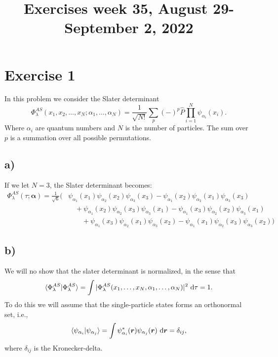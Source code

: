 \documentclass[a4paper, 11pt, notitlepage, english]{article}
\title{Exercises week 35, August 29-September 2, 2022}
\newcommand{\braket}[2]{\langle #1 | #2 \rangle}
\newcommand{\op}[1]{\hat{#1}}
\renewcommand{\d}{{\rm d}}
\newcommand{\bt}[1]{\boldsymbol{#1}}
\begin{document}
\maketitle

\section*{Exercise 1}

In this problem we consider the Slater determinant
$$\Phi_\lambda^{AS} (x_1, x_2, \ldots, x_N; \alpha_1, \ldots, \alpha_N) = \frac{1}{\sqrt{N!}}\sum_p (-)^p \op{P} \prod_{i=1}^N \psi_{\alpha_i}(x_i).$$
Where $\alpha_i$ are quantum numbers and $N$ is the number of particles. The sum over $p$ is a summation over all possible permutations.

\subsection*{a)}
If we let $N=3$, the Slater determinant becomes:
\begin{align*}   
\Phi_\lambda^{AS}(\tau;\bt{\alpha}) = \frac{1}{\sqrt{6}} \bigg(
&\psi_{\alpha_1}(x_1) \psi_{\alpha_2} (x_2)\psi_{\alpha_3}(x_3)
- \psi_{\alpha_1}(x_2) \psi_{\alpha_2} (x_1)\psi_{\alpha_3}(x_3) \\
&\quad+ \psi_{\alpha_1}(x_2) \psi_{\alpha_2} (x_3)\psi_{\alpha_3}(x_1)  
- \psi_{\alpha_1}(x_3) \psi_{\alpha_2} (x_2)\psi_{\alpha_3}(x_1) \\
&\qquad+ \psi_{\alpha_1}(x_3) \psi_{\alpha_2} (x_1)\psi_{\alpha_3}(x_2) 
- \psi_{\alpha_1}(x_1) \psi_{\alpha_2} (x_3)\psi_{\alpha_3}(x_2)\bigg)
\end{align*}

\subsection*{b)}
We will no show that the slater determinant is normalized, in the sense that
$$\braket{\Phi_\lambda^{AS}}{\Phi_\lambda^{AS}} = \int |\Phi_\lambda^{AS} (x_1,\ldots, x_N, \alpha_1, \ldots, \alpha_N)|^2 \ \d \tau= 1.$$
To do this we will assume that the single-particle states forms an orthonormal set, i.e.,
$$\braket{\psi_{\alpha_i}}{\psi_{\alpha_j}} = \int \psi^*_{\alpha_i}(\bt{r})\psi_{\alpha_j}(\bt{r}) \ \d \bt{r} = \delta_{ij},$$
where $\delta_{ij}$ is the Kronecker-delta.
\end{document}
